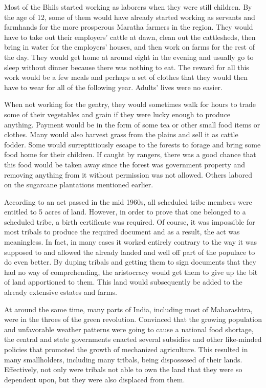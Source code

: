 \documentclass[report.tex]{subfiles}
\begin{document}
Most of the Bhils started working as laborers when they were still children. By the age of 12, some of them would have already started working as servants and farmhands for the more prosperous Maratha farmers in the region. They would have to take out their employers' cattle at dawn, clean out the cattlesheds, then bring in water for the employers' houses, and then work on farms for the rest of the day. They would get home at around eight in the evening and usually go to sleep without dinner because there was nothing to eat. The reward for all this work would be a few meals and perhaps a set of clothes that they would then have to wear for all of the following year. Adults' lives were no easier.

When not working for the gentry, they would sometimes walk for hours to trade some of their vegetables and grain if they were lucky enough to produce anything. Payment would be in the form of some tea or other small food items or clothes. Many would also harvest grass from the plains and sell it as cattle fodder. Some would surreptitiously escape to the forests to forage and bring some food home for their children. If caught by rangers, there was a good chance that this food would be taken away since the forest was government property and removing anything from it without permission was not allowed. Others labored on the sugarcane plantations mentioned earlier.

According to an act passed in the mid 1960s, all scheduled tribe members were entitled to 5 acres of land. However, in order to prove that one belonged to a scheduled tribe, a birth certificate was required. Of course, it was impossible for most tribals to produce the required document and as a result, the act was meaningless. In fact, in many cases it worked entirely contrary to the way it was supposed to and allowed the already landed and well off part of the populace to do even better. By duping tribals and getting them to sign documents that they had no way of comprehending, the aristocracy would get them to give up the bit of land apportioned to them. This land would subsequently be added to the already extensive estates and farms.

At around the same time, many parts of India, including most of Maharashtra, were in the throes of the green revolution. Convinced that the growing population and unfavorable weather patterns were going to cause a national food shortage, the central and state governments enacted several subsidies and other like-minded policies that promoted the growth of mechanized agriculture. This resulted in many smallholders, including many tribals, being dispossesed of their lands. Effectively, not only were tribals not able to own the land that they were so dependent upon, but they were also displaced from them.
\end{document}
